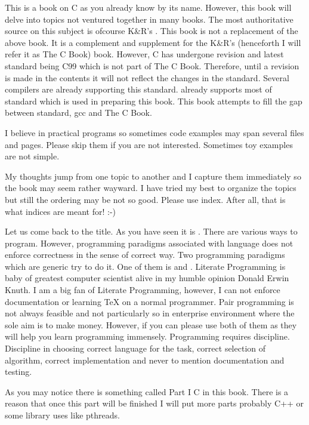 This is a book on C as you already know by its name. However, this book will
delve into topics not ventured together in many books. The most authoritative
source on this subject is ofcourse K\&R's . This book is not a replacement of the above book. It is a complement
and supplement for the K\&R's (henceforth I will refer it as The C Book) book.
However, C has undergone revision and latest standard being C99 which is not
part of The C Book. Therefore, until a revision is made in the contents it
will not reflect the changes in the standard. Several compilers are already
supporting this standard.  already supports most of standard which is
used in preparing this book. This book attempts to fill the gap between
standard, gcc and The C Book.

I believe in practical programs so sometimes code examples may span several
files and pages. Please skip them if you are not interested. Sometimes toy
examples are not simple.

My thoughts jump from one topic to another and I capture them immediately so
the book may seem rather wayward. I have tried my best to organize the topics
but still the ordering may be not so good. Please use index. After all, that 
is what indices are meant for! :-)

Let us come back to the title. As you have seen it is . There are various ways to program. However, programming paradigms
associated with language does not enforce correctness in the sense of correct
way. Two programming paradigms which are generic try to do it. One of them is
 and . Literate
Programming is baby of greatest computer scientist alive in my humble opinion
Donald Erwin Knuth. I am a big fan of Literate Programming, however, I can not
enforce documentation or learning \TeX{} on a normal programmer. Pair
programming is not always feasible and not particularly so in enterprise
environment where the sole aim is to make money. However, if you can
please use both of them as they will help you learn programming
immensely. Programming requires discipline. Discipline in choosing
correct language for the task, correct selection of algorithm, correct
implementation and never to mention documentation and testing.

As you may notice there is something called Part I C in this
book. There is a reason that once this part will be finished I will
put more parts probably C++ or some library uses like pthreads.

